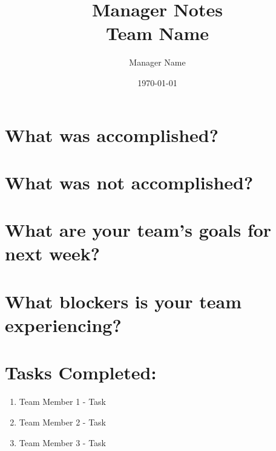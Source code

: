 \documentclass{article}
\title{Manager Notes \\
    \Large{Team Name}
}
\author{Manager Name}
\date{\today}
\begin{document}
\maketitle



\section{What was accomplished? }








\section{What was not accomplished?}







\section{What are your team's goals for next week?}








\section{What blockers is your team experiencing?}








\section{Tasks Completed:}
\begin{enumerate}
  \item Team Member 1 - Task
  \item Team Member 2 - Task
  \item Team Member 3 - Task
\end{enumerate}
\end{document}
